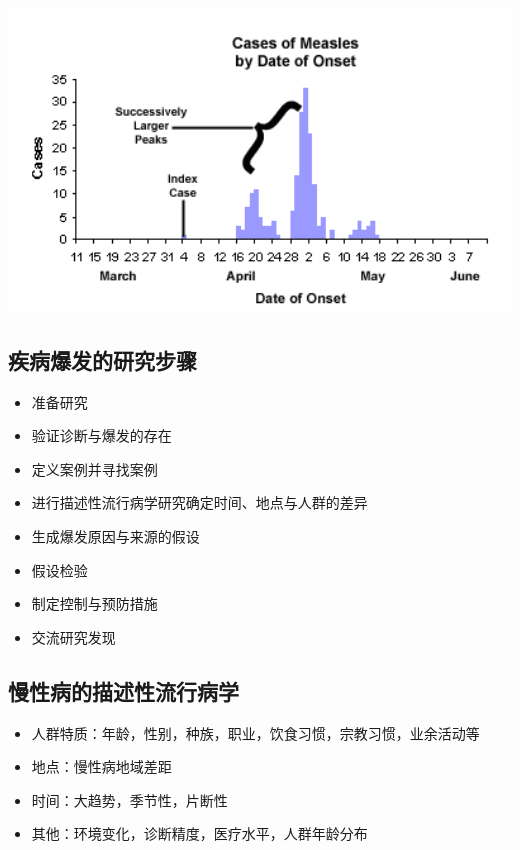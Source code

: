 \documentclass[]{book}
\providecommand{\tightlist}{%
  \setlength{\itemsep}{0pt}\setlength{\parskip}{0pt}}
\begin{document}
\includegraphics[width=5.53in]{images/EpidemicCurve_Measles}

\hypertarget{ux75beux75c5ux7206ux53d1ux7684ux7814ux7a76ux6b65ux9aa4}{%
\subsection{疾病爆发的研究步骤}\label{ux75beux75c5ux7206ux53d1ux7684ux7814ux7a76ux6b65ux9aa4}}

\begin{itemize}
\tightlist
\item
  准备研究
\item
  验证诊断与爆发的存在
\item
  定义案例并寻找案例
\item
  进行描述性流行病学研究确定时间、地点与人群的差异
\item
  生成爆发原因与来源的假设
\item
  假设检验
\item
  制定控制与预防措施
\item
  交流研究发现
\end{itemize}

\hypertarget{ux6162ux6027ux75c5ux7684ux63cfux8ff0ux6027ux6d41ux884cux75c5ux5b66}{%
\subsection{慢性病的描述性流行病学}\label{ux6162ux6027ux75c5ux7684ux63cfux8ff0ux6027ux6d41ux884cux75c5ux5b66}}

\begin{itemize}
\tightlist
\item
  人群特质：年龄，性别，种族，职业，饮食习惯，宗教习惯，业余活动等
\item
  地点：慢性病地域差距
\item
  时间：大趋势，季节性，片断性
\item
  其他：环境变化，诊断精度，医疗水平，人群年龄分布
\end{itemize}
\end{document}
